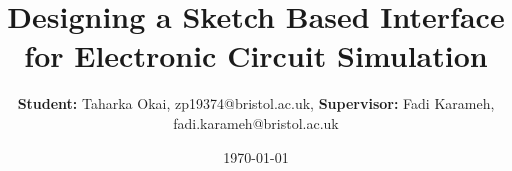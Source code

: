 


\usepackage[T1]{fontenc}
\usepackage{lmodern}
\usepackage[size=a1,scale=1.1]{beamerposter}


\usepackage{graphicx}
\usepackage{booktabs}
\usepackage{tikz}
\usepackage{pgfplots}
\pgfplotsset{compat=1.17}
\usepackage{multicol}
\usepackage{caption}
\usepackage{subcaption}
\captionsetup{font=normalsize}

\newcommand{\ncols}{3}
\newlength{\sepwidth}
\newlength{\colwidth}
\newlength{\midspace}
\setlength{\sepwidth}{0.015\paperwidth}
\setlength{\colwidth}{
{\dimexpr \paperwidth / \ncols \relax} -
{\dimexpr \sepwidth + \sepwidth / \ncols \relax}
}
\setlength{\midspace}{20ex}

\newcommand{\separatorcolumn}{\begin{column}{\sepwidth}\end{column}}


\title{Designing a Sketch Based Interface for Electronic Circuit Simulation}

\author{
  \textbf{Student:} Taharka Okai, zp19374@bristol.ac.uk,
  \textbf{Supervisor:} Fadi Karameh, fadi.karameh@bristol.ac.uk
}

\date{\today}


